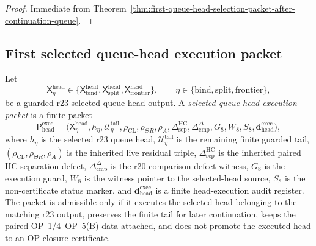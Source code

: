 \begin{proof}
Immediate from Theorem~\ref{thm:first-queue-head-selection-packet-after-continuation-queue}.
\end{proof}


\subsection{First selected queue-head execution packet}
\label{subsec:first-selected-queue-head-execution-packet}

\begin{definition}
\label{def:selected-queue-head-execution-packet}
Let
\[
  \mathsf X_{\eta}^{\mathrm{head}}
  \in
  \{\mathsf X_{\mathrm{bind}}^{\mathrm{head}},
    \mathsf X_{\mathrm{split}}^{\mathrm{head}},
    \mathsf X_{\mathrm{frontier}}^{\mathrm{head}}\},
  \qquad
  \eta\in\{\mathrm{bind},\mathrm{split},\mathrm{frontier}\},
\]
be a guarded r23 selected queue-head output.  A \emph{selected queue-head execution packet} is a finite packet
\[
  \mathsf P_{\mathrm{head}}^{\mathrm{exec}}
  =
  \bigl(
    \mathsf X_{\eta}^{\mathrm{head}},
    h_{\eta},
    \mathcal U_{\eta}^{\mathrm{tail}},
    \rho_{\mathrm{CL}},\rho_{\Theta R},\rho_A,
    \Delta_{\mathrm{sep}}^{\mathrm{HC}},
    \Delta_{\mathrm{cmp}}^{\Delta},
    G_8,W_8,S_8,
    \mathbf d_{\mathrm{head}}^{\mathrm{exec}}
  \bigr),
\]
where \(h_{\eta}\) is the selected r23 queue head, \(\mathcal U_{\eta}^{\mathrm{tail}}\) is the remaining finite guarded tail, \((\rho_{\mathrm{CL}},\rho_{\Theta R},\rho_A)\) is the inherited live residual triple, \(\Delta_{\mathrm{sep}}^{\mathrm{HC}}\) is the inherited paired HC separation defect, \(\Delta_{\mathrm{cmp}}^{\Delta}\) is the r20 comparison-defect witness, \(G_8\) is the execution guard, \(W_8\) is the witness pointer to the selected-head source, \(S_8\) is the non-certificate status marker, and \(\mathbf d_{\mathrm{head}}^{\mathrm{exec}}\) is a finite head-execution audit register.  The packet is admissible only if it executes the selected head belonging to the matching r23 output, preserves the finite tail for later continuation, keeps the paired OP~1/4--OP~5(B) data attached, and does not promote the executed head to an OP closure certificate.
\end{definition}

